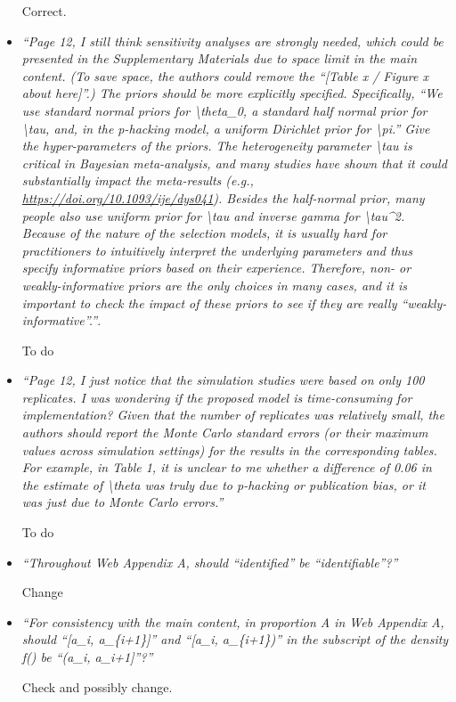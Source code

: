 \documentclass[11pt]{article}
\begin{document}
\begin{itemize}
Correct.\\


\item \emph{``Page 12, I still think sensitivity analyses are strongly needed, which could be presented in the Supplementary Materials due to space limit in the main content. (To save space, the authors could remove the ``[Table x / Figure x about here]''.) The priors should be more explicitly specified. Specifically, ``We use standard normal priors for \textbackslash theta\_0, a standard half normal prior for \textbackslash tau, and, in the p-hacking model, a uniform Dirichlet prior for \textbackslash pi.'' Give the hyper-parameters of the priors. The heterogeneity parameter \textbackslash tau is critical in Bayesian meta-analysis, and many studies have shown that it could substantially impact the meta-results (e.g., \url{https://doi.org/10.1093/ije/dys041}). Besides the half-normal prior, many people also use uniform prior for \textbackslash tau and inverse gamma for \textbackslash tau\^{}2. Because of the nature of the selection models, it is usually hard for practitioners to intuitively interpret the underlying parameters and thus specify informative priors based on their experience. Therefore, non- or weakly-informative priors are the only choices in many cases, and it is important to check the impact of these priors to see if they are really ``weakly-informative''.''}.

To do\\


\item \emph{``Page 12, I just notice that the simulation studies were based on only 100 replicates. I was wondering if the proposed model is time-consuming for implementation? Given that the number of replicates was relatively small, the authors should report the Monte Carlo standard errors (or their maximum values across simulation settings) for the results in the corresponding tables. For example, in Table 1, it is unclear to me whether a difference of 0.06 in the estimate of \textbackslash theta was truly due to p-hacking or publication bias, or it was just due to Monte Carlo errors.''}

To do\\


\item \emph{``Throughout Web Appendix A, should “identified” be “identifiable”?''}

Change\\


\item \emph{``For consistency with the main content, in proportion A in Web Appendix A, should ``[a\_i, a\_\{i+1\}]'' and ``[a\_i, a\_\{i+1\})'' in the subscript of the density f() be ``(a\_i, a\_{i+1}]''?''}

Check and possibly change.

\end{itemize}
\end{document}
